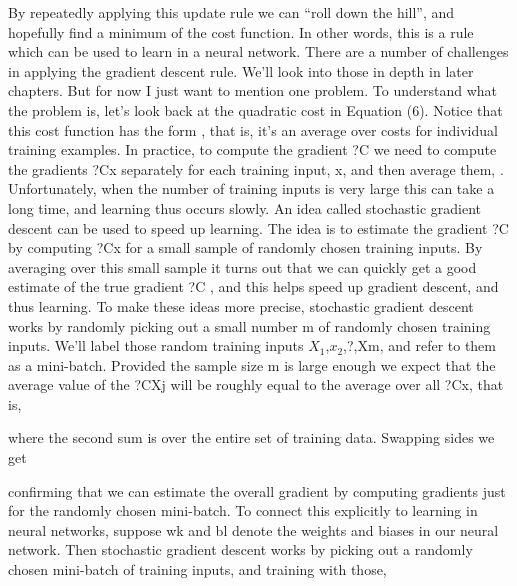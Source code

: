 By repeatedly applying this update rule we can ``roll down the hill'', and hopefully find a minimum of the cost function. In other words, this is a rule which can be used to learn in a neural network.
There are a number of challenges in applying the gradient descent rule. We'll look into those in depth in later chapters. But for now I just want to mention one problem. To understand what the problem is, let's look back at the quadratic cost in Equation (6). Notice that this cost function has the form , that is, it's an average over costs  for individual training examples. In practice, to compute the gradient ?C we need to compute the gradients ?Cx separately for each training input, x, and then average them, . Unfortunately, when the number of training inputs is very large this can take a long time, and learning thus occurs slowly.
An idea called stochastic gradient descent can be used to speed up learning. The idea is to estimate the gradient ?C by computing ?Cx for a small sample of randomly chosen training inputs. By averaging over this small sample it turns out that we can quickly get a good estimate of the true gradient ?C , and this helps speed up gradient descent, and thus learning.
To make these ideas more precise, stochastic gradient descent works by randomly picking out a small number m of randomly chosen training inputs. We'll label those random training inputs $X_1$,$x_2$,?,Xm, and refer to them as a mini-batch. Provided the sample size m is large enough we expect that the average value of the ?CXj will be roughly equal to the average over all ?Cx, that is, 

where the second sum is over the entire set of training data. Swapping sides we get 

confirming that we can estimate the overall gradient by computing gradients just for the randomly chosen mini-batch. 
To connect this explicitly to learning in neural networks, suppose wk and bl denote the weights and biases in our neural network. Then stochastic gradient descent works by picking out a randomly chosen mini-batch of training inputs, and training with those, 

